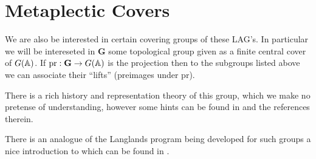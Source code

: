     \section{Metaplectic Covers}
    We are also be interested in certain covering groups of these LAG's. In particular \cite[I.1.1]{moeglinSpectralDecompositionEisenstein1995} we will be intereseted in \(\mathbf{G}\) some topological group given as a finite central cover of \(G(\A)\). If \(\mathrm{pr}: \mathbf{G} \to G(\A)\) is the projection then to the subgroups listed above we can associate their ``lifts'' (preimages under \(\mathrm{pr}\)). 

\begin{example}
    
    
    There is a rich history and representation theory of this group, which we make no pretense of understanding, however some hints can be found in \cite{kudlaNOTESLOCALTHETA} and the references therein.
\end{example}

There is an analogue of the Langlands program being developed for such groups a nice introduction to which can be found in \cite{ganLgroupsLanglandsProgram2017}. 
